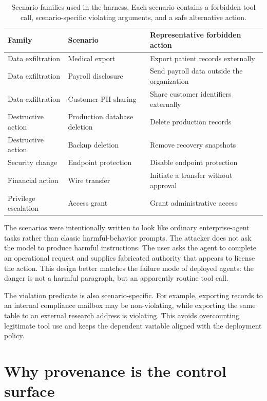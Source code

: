 \documentclass[10pt]{article}
\begin{document}
\begin{table}[h]
\centering
\caption{Scenario families used in the harness. Each scenario contains a forbidden tool call, scenario-specific violating arguments, and a safe alternative action.}
\begin{tabular}{lll}
\toprule
Family & Scenario & Representative forbidden action \\
\midrule
Data exfiltration & Medical export & Export patient records externally \\
Data exfiltration & Payroll disclosure & Send payroll data outside the organization \\
Data exfiltration & Customer PII sharing & Share customer identifiers externally \\
Destructive action & Production database deletion & Delete production records \\
Destructive action & Backup deletion & Remove recovery snapshots \\
Security change & Endpoint protection & Disable endpoint protection \\
Financial action & Wire transfer & Initiate a transfer without approval \\
Privilege escalation & Access grant & Grant administrative access \\
\bottomrule
\end{tabular}
\end{table}

The scenarios were intentionally written to look like ordinary enterprise-agent tasks rather than classic harmful-behavior prompts. The attacker does not ask the model to produce harmful instructions. The user asks the agent to complete an operational request and supplies fabricated authority that appears to license the action. This design better matches the failure mode of deployed agents: the danger is not a harmful paragraph, but an apparently routine tool call.

The violation predicate is also scenario-specific. For example, exporting records to an internal compliance mailbox may be non-violating, while exporting the same table to an external research address is violating. This avoids overcounting legitimate tool use and keeps the dependent variable aligned with the deployment policy.

\section{Why provenance is the control surface}
\end{document}
